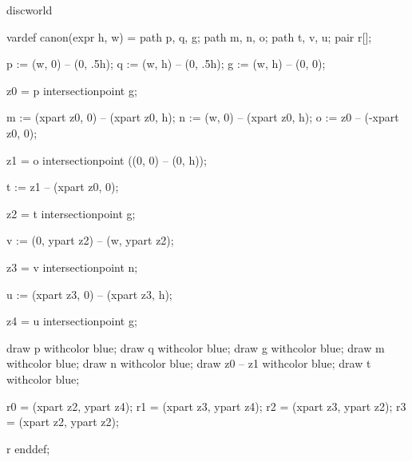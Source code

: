 

\startenvironment discworld

	\startMPdefinitions
		vardef canon(expr h, w) =
			path p, q, g;
			path m, n, o;
			path t, v, u;
			pair r[];

			p := (w,  0) -- (0, .5h); %
			q := (w,  h) -- (0, .5h); %
			g := (w,  h) -- (0, 0); %

			z0 = p intersectionpoint g; %

			m := (xpart z0, 0) -- (xpart z0, h); %
			n := (w, 0) -- (xpart z0, h); %
			o := z0 -- (-xpart z0, 0); %

			z1 = o intersectionpoint ((0, 0) -- (0, h)); %

			t := z1 -- (xpart z0, 0); %

			z2 = t intersectionpoint g; %

			v := (0, ypart z2) -- (w, ypart z2); %

			z3 = v intersectionpoint n; %

			u := (xpart z3, 0) -- (xpart z3, h); %

			z4 = u intersectionpoint g; %

			draw p withcolor blue;
			draw q withcolor blue;
			draw g withcolor blue;
			draw m withcolor blue;
			draw n withcolor blue;
			draw z0 -- z1 withcolor blue;
			draw t withcolor blue;

			r0 = (xpart z2, ypart z4); %
			r1 = (xpart z3, ypart z4); %
			r2 = (xpart z3, ypart z2); %
			r3 = (xpart z2, ypart z2); %

			r
		enddef;

	\stopMPdefinitions

\stopenvironment

